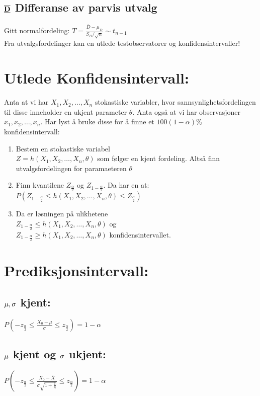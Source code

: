 \documentclass[12pt,a4paper,twocolumn,twoside]{article}
\begin{document}
\subsection*{$\bold{\underline{\overline{D}}}$ Differanse av parvis utvalg}
Gitt normalfordeling: $T=\frac{\overline{D}-\mu_D}{S_D/\sqrt{n}}\sim t_{n-1}$\\
Fra utvalgsfordelinger kan en utlede testobservatorer og konfidensintervaller!
%
%
\section*{Utlede Konfidensintervall:}
Anta at vi har $X_1,X_2,\dots,X_n$ stokastiske variabler, hvor sannsynlighetsfordelingen til disse inneholder
en ukjent parameter $\theta$. Anta også at vi har observasjoner $x_1,x_2,\dots,x_n$. Har lyst å bruke disse 
for å finne et $100(1-\alpha)\%$ konfidensintervall:
\begin{enumerate}[topsep=0pt,itemsep=0pt, partopsep=0pt]
    \item Bestem en stokastiske variabel\\ $Z = h(X_1,X_2,\dots,X_n,\theta)$ som følger en kjent fordeling. Altså finn
     utvalgsfordelingen for paramaeteren $\theta$
    \item Finn kvantilene $Z_{\frac{\alpha}{2}}$ og $Z_{1-\frac{\alpha}{2}}$. Da har en at: $P(Z_{1-\frac{\alpha}{2}}\leq h(X_1,X_2,\dots,X_n,\theta)\leq Z_{\frac{\alpha}{2}})$
    \item Da er løsningen på ulikhetene\\ $Z_{1-\frac{\alpha}{2}} \leq h(X_1,X_2,\dots,X_n,\theta)$ og \\$Z_{1-\frac{\alpha}{2}}\geq h(X_1,X_2,\dots,X_n,\theta)$ konfidensintervallet.
\end{enumerate}
%
%
\section*{Prediksjonsintervall:}
\subsection*{$\bold{\mu,\sigma}$ kjent:}
$P\left(-z_{\frac{\alpha}{2}}\leq\frac{X_0-\mu}{\sigma}\leq z_{\frac{\alpha}{2}}\right) = 1-\alpha$
\subsection*{$\bold{\mu}$ kjent og $\bold{\sigma}$ ukjent:}
$P\left(-z_{\frac{\alpha}{2}}\leq\frac{X_0-\overline{X}}{\sigma\sqrt{1+\frac{1}{n}}}\leq z_{\frac{\alpha}{2}}\right) = 1-\alpha$
\end{document}
